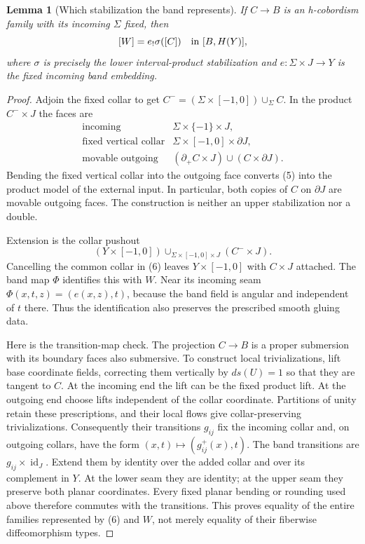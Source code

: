 \documentclass[11pt]{article}
\newtheorem{lemma}[theorem]{Lemma}
\begin{document}
\begin{lemma}[Which stabilization the band represents]\label{lem:which}
If $C\to B$ is an h-cobordism family with its incoming $\Sigma$ fixed,
then
\[
 [W]=e_!\sigma([C])\quad\hbox{in }[B,H(Y)],
\]
where $\sigma$ is precisely the lower interval-product stabilization
and $e:\Sigma\times J\to Y$ is the fixed incoming band embedding.
\end{lemma}
\begin{proof}
Adjoin the fixed collar to get
$C^-=(\Sigma\times[-1,0])\cup_\Sigma C$.
In the product $C^-\times J$ the faces are
\[
\begin{array}{ll}
\text{incoming}&\Sigma\times\{-1\}\times J,\\
\text{fixed vertical collar}&\Sigma\times[-1,0]\times\partial J,\\
\text{movable outgoing}&(\partial_+C\times J)\cup(C\times\partial J).
\end{array}                                                     \tag{5}
\]
Bending the fixed vertical collar into the outgoing face converts
(5) into the product model of the external input. In particular,
both copies of $C$ on $\partial J$ are movable outgoing faces.
The construction is neither an upper stabilization nor a double.

Extension is the collar pushout
\[
 (Y\times[-1,0])\cup_{\Sigma\times[-1,0]\times J}(C^-\times J).
                                                               \tag{6}
\]
Cancelling the common collar in (6) leaves $Y\times[-1,0]$ with
$C\times J$ attached. The band map $\Phi$ identifies this with $W$.
Near its incoming seam $\Phi(x,t,z)=(e(x,z),t)$, because the band
field is angular and independent of $t$ there. Thus the identification
also preserves the prescribed smooth gluing data.

Here is the transition-map check. The projection $C\to B$ is a proper
submersion with its boundary faces also submersive. To construct local
trivializations, lift base coordinate fields, correcting them vertically
by $ds(U)=1$ so that they are tangent to $C$. At the incoming end the
lift can be the fixed product lift. At the outgoing end choose lifts
independent of the collar coordinate. Partitions of unity retain these
prescriptions, and their local flows give collar-preserving trivializations.
Consequently their transitions $g_{ij}$ fix the incoming collar and,
on outgoing collars, have the form $(x,t)\mapsto(g^+_{ij}(x),t)$.
The band transitions are $g_{ij}\times\operatorname{id}_J$.
Extend them by identity over the added collar and over its complement
in $Y$. At the lower seam they are identity; at the upper seam they
preserve both planar coordinates. Every fixed planar bending or rounding
used above therefore commutes with the transitions. This proves equality
of the entire families represented by (6) and $W$, not merely equality
of their fiberwise diffeomorphism types.
\end{proof}
\end{document}
